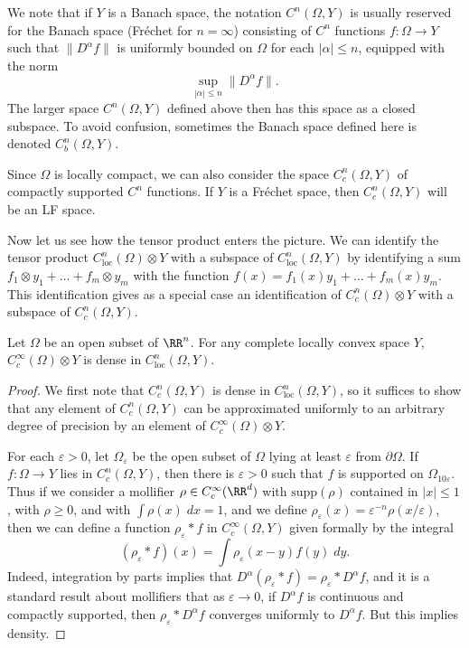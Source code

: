 \begin{remark}
    We note that if $Y$ is a Banach space, the notation $C^n(\Omega,Y)$ is usually reserved for the Banach space (Fr\'{e}chet for $n = \infty$) consisting of $C^n$ functions $f: \Omega \to Y$ such that $\| D^\alpha f \|$ is uniformly bounded on $\Omega$ for each $|\alpha| \leq n$, equipped with the norm
    \[ \sup_{|\alpha| \leq n} \| D^\alpha f \|. \]
    The larger space $C^n(\Omega,Y)$ defined above then has this space as a closed subspace. To avoid confusion, sometimes the Banach space defined here is denoted $C^n_b(\Omega,Y)$.
\end{remark}

Since $\Omega$ is locally compact, we can also consider the space $C^n_c(\Omega,Y)$ of compactly supported $C^n$ functions. If $Y$ is a Fr\'{e}chet space, then $C^n_c(\Omega,Y)$ will be an LF space.

Now let us see how the tensor product enters the picture. We can identify the tensor product $C^n_{\text{loc}}(\Omega) \otimes Y$ with a subspace of $C^n_{\text{loc}}(\Omega,Y)$ by identifying a sum $f_1 \otimes y_1 + \dots + f_m \otimes y_m$ with the function $f(x) = f_1(x) y_1 + \dots + f_m(x) y_m$. This identification gives as a special case an identification of $C^n_c(\Omega) \otimes Y$ with a subspace of $C^n_c(\Omega,Y)$.

\begin{lemma}
    Let $\Omega$ be an open subset of $\RR^n$. For any complete locally convex space $Y$, $C_c^\infty(\Omega) \otimes Y$ is dense in $C^n_{\text{loc}}(\Omega,Y)$.
\end{lemma}
\begin{proof}
    We first note that $C_c^n(\Omega,Y)$ is dense in $C^n_{\text{loc}}(\Omega,Y)$, so it suffices to show that any element of $C_c^n(\Omega,Y)$ can be approximated uniformly to an arbitrary degree of precision by an element of $C_c^\infty(\Omega) \otimes Y$.

    For each $\varepsilon > 0$, let $\Omega_\varepsilon$ be the open subset of $\Omega$ lying at least $\varepsilon$ from $\partial \Omega$. If $f: \Omega \to Y$ lies in $C_c^n(\Omega,Y)$, then there is $\varepsilon > 0$ such that $f$ is supported on $\Omega_{10 \varepsilon}$. Thus if we consider a mollifier $\rho \in C_c^\infty(\RR^d)$ with $\text{supp}(\rho)$ contained in $|x| \leq 1$, with $\rho \geq 0$, and with $\int \rho(x)\; dx = 1$, and we define $\rho_\varepsilon(x) = \varepsilon^{-n} \rho(x / \varepsilon)$, then we can define a function $\rho_\varepsilon * f$ in $C_c^\infty(\Omega,Y)$ given formally by the integral
    \[ (\rho_\varepsilon * f)(x) = \int \rho_\varepsilon(x - y) f(y)\; dy. \]
    Indeed, integration by parts implies that $D^\alpha (\rho_\varepsilon * f) = \rho_\varepsilon * D^\alpha f$, and it is a standard result about mollifiers that as $\varepsilon \to 0$, if $D^\alpha f$ is continuous and compactly supported, then $\rho_\varepsilon * D^\alpha f$ converges uniformly to $D^\alpha f$. But this implies density.
\end{proof}

